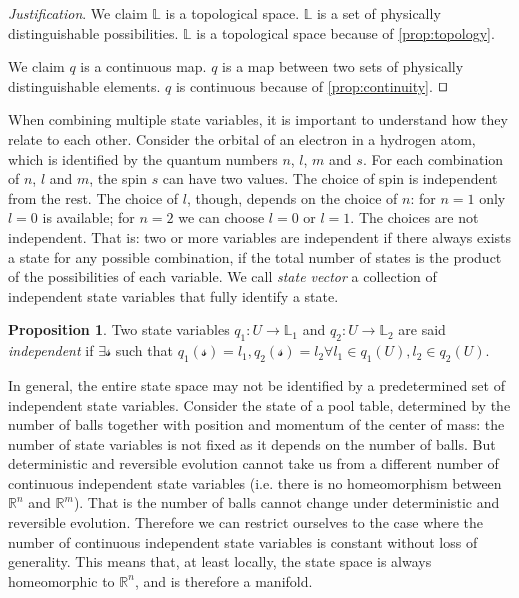 \documentclass[smallextended]{svjour3}
\numberwithin{equation}{section}
\newenvironment{justification}{\emph{Justification}.}{\hfill\(\qed\)}
\theoremstyle{definition}
\newtheorem{prop}[equation]{Proposition}
\newenvironment{justification}{\emph{Justification}.}{\qed}
\begin{document}
\begin{justification}
	We claim $\mathbb{L}$ is a topological space. $\mathbb{L}$ is a set of physically distinguishable possibilities. $\mathbb{L}$ is a topological space because of \ref{prop:topology}.
	
	We claim $q$ is a continuous map. $q$ is a map between two sets of physically distinguishable elements. $q$ is continuous because of \ref{prop:continuity}.
\end{justification}

When combining multiple state variables, it is important to understand how they relate to each other. Consider the orbital of an electron in a hydrogen atom, which is identified by the quantum numbers $n$, $l$, $m$ and $s$. For each combination of $n$, $l$ and $m$, the spin $s$ can have two values. The choice of spin is independent from the rest. The choice of $l$, though, depends on the choice of $n$: for $n=1$ only $l=0$ is available; for $n=2$ we can choose $l=0$ or $l=1$. The choices are not independent. That is: two or more variables are independent if there always exists a state for any possible combination, if the total number of states is the product of the possibilities of each variable. We call \emph{state vector} a collection of independent state variables that fully identify a state.

\begin{prop}\label{prop:independent_state_variables}
	Two state variables $q_1 : U \rightarrow \mathbb{L}_1$ and $q_2 : U \rightarrow \mathbb{L}_2$ are said \emph{independent} if $\exists \mathcal{s}$ such that $q_1(\mathcal{s})=l_1, q_2(\mathcal{s})=l_2 \forall l_1 \in q_1(U), l_2 \in q_2(U)$.
\end{prop}

In general, the entire state space may not be identified by a predetermined set of independent state variables. Consider the state of a pool table, determined by the number of balls together with position and momentum of the center of mass: the number of state variables is not fixed as it depends on the number of balls. But deterministic and reversible evolution cannot take us from a different number of continuous independent state variables (i.e. there is no homeomorphism between $\mathbb{R}^n$ and $\mathbb{R}^m$). That is the number of balls cannot change under deterministic and reversible evolution. Therefore we can restrict ourselves to the case where the number of continuous independent state variables is constant without loss of generality. This means that, at least locally, the state space is always homeomorphic to $\mathbb{R}^n$, and is therefore a manifold.
\end{document}
